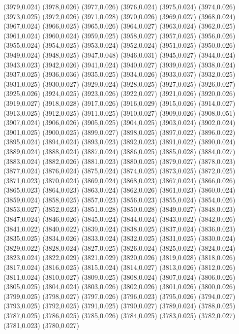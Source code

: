 (3979,0.024)
(3978,0.026)
(3977,0.026)
(3976,0.024)
(3975,0.024)
(3974,0.026)
(3973,0.025)
(3972,0.026)
(3971,0.028)
(3970,0.026)
(3969,0.027)
(3968,0.024)
(3967,0.024)
(3966,0.025)
(3965,0.026)
(3964,0.027)
(3963,0.024)
(3962,0.025)
(3961,0.024)
(3960,0.024)
(3959,0.025)
(3958,0.027)
(3957,0.025)
(3956,0.026)
(3955,0.024)
(3954,0.025)
(3953,0.024)
(3952,0.024)
(3951,0.025)
(3950,0.026)
(3949,0.024)
(3948,0.025)
(3947,0.048)
(3946,0.031)
(3945,0.027)
(3944,0.024)
(3943,0.023)
(3942,0.026)
(3941,0.024)
(3940,0.027)
(3939,0.025)
(3938,0.024)
(3937,0.025)
(3936,0.036)
(3935,0.025)
(3934,0.026)
(3933,0.037)
(3932,0.025)
(3931,0.025)
(3930,0.027)
(3929,0.024)
(3928,0.025)
(3927,0.025)
(3926,0.027)
(3925,0.026)
(3924,0.025)
(3923,0.026)
(3922,0.027)
(3921,0.026)
(3920,0.026)
(3919,0.027)
(3918,0.028)
(3917,0.026)
(3916,0.029)
(3915,0.026)
(3914,0.027)
(3913,0.025)
(3912,0.025)
(3911,0.025)
(3910,0.027)
(3909,0.026)
(3908,0.051)
(3907,0.024)
(3906,0.026)
(3905,0.025)
(3904,0.025)
(3903,0.024)
(3902,0.024)
(3901,0.025)
(3900,0.025)
(3899,0.027)
(3898,0.025)
(3897,0.022)
(3896,0.022)
(3895,0.024)
(3894,0.024)
(3893,0.023)
(3892,0.023)
(3891,0.022)
(3890,0.024)
(3889,0.024)
(3888,0.024)
(3887,0.024)
(3886,0.025)
(3885,0.028)
(3884,0.027)
(3883,0.024)
(3882,0.026)
(3881,0.023)
(3880,0.025)
(3879,0.027)
(3878,0.023)
(3877,0.024)
(3876,0.024)
(3875,0.024)
(3874,0.025)
(3873,0.025)
(3872,0.025)
(3871,0.023)
(3870,0.024)
(3869,0.024)
(3868,0.023)
(3867,0.024)
(3866,0.026)
(3865,0.023)
(3864,0.023)
(3863,0.024)
(3862,0.026)
(3861,0.023)
(3860,0.024)
(3859,0.024)
(3858,0.025)
(3857,0.023)
(3856,0.023)
(3855,0.024)
(3854,0.026)
(3853,0.027)
(3852,0.023)
(3851,0.028)
(3850,0.028)
(3849,0.027)
(3848,0.023)
(3847,0.024)
(3846,0.026)
(3845,0.024)
(3844,0.024)
(3843,0.022)
(3842,0.026)
(3841,0.022)
(3840,0.022)
(3839,0.024)
(3838,0.025)
(3837,0.024)
(3836,0.023)
(3835,0.025)
(3834,0.026)
(3833,0.024)
(3832,0.025)
(3831,0.025)
(3830,0.024)
(3829,0.022)
(3828,0.024)
(3827,0.025)
(3826,0.024)
(3825,0.022)
(3824,0.024)
(3823,0.024)
(3822,0.029)
(3821,0.029)
(3820,0.026)
(3819,0.028)
(3818,0.026)
(3817,0.024)
(3816,0.025)
(3815,0.024)
(3814,0.027)
(3813,0.026)
(3812,0.026)
(3811,0.024)
(3810,0.027)
(3809,0.025)
(3808,0.024)
(3807,0.024)
(3806,0.026)
(3805,0.025)
(3804,0.024)
(3803,0.026)
(3802,0.026)
(3801,0.026)
(3800,0.026)
(3799,0.025)
(3798,0.027)
(3797,0.026)
(3796,0.023)
(3795,0.026)
(3794,0.027)
(3793,0.025)
(3792,0.025)
(3791,0.025)
(3790,0.027)
(3789,0.024)
(3788,0.025)
(3787,0.025)
(3786,0.025)
(3785,0.026)
(3784,0.025)
(3783,0.025)
(3782,0.027)
(3781,0.023)
(3780,0.027)
